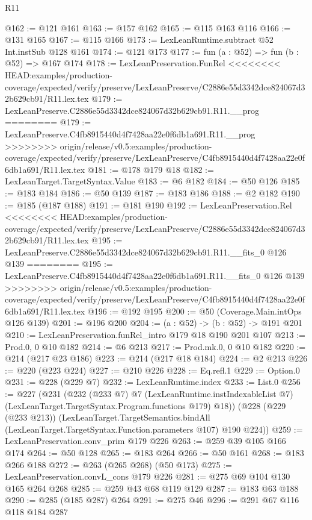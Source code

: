 \begin{lexlean}{R11}
\begin{coremodule}
{{{{{@162 := @121 @161
@163 := @157 @162
@165 := @115 @163 @116
@166 := @131 @165
@167 := @115 @166
@173 := LexLeanRuntime.subtract @52 Int.instSub @128 @161
@174 := @121 @173
@177 := fun (a : @52) => fun (b : @52) => @167 @174
@178 := LexLeanPreservation.FunRel
<<<<<<<< HEAD:examples/production-coverage/expected/verify/preserve/LexLeanPreserve/C2886e55d3342dce824067d32b629cb91/R11.lex.tex
@179 := LexLeanPreserve.C2886e55d3342dce824067d32b629cb91.R11.__prog
========
@179 := LexLeanPreserve.C4fb8915440d4f7428aa22e0f6db1a691.R11.__prog
>>>>>>>> origin/release/v0.5:examples/production-coverage/expected/verify/preserve/LexLeanPreserve/C4fb8915440d4f7428aa22e0f6db1a691/R11.lex.tex
@181 := @178 @179 @18
@182 := LexLeanTarget.TargetSyntax.Value
@183 := @6 @182
@184 := @50 @126
@185 := @183 @184
@186 := @50 @139
@187 := @183 @186
@188 := @2 @182
@190 := @185 (@187 @188)
@191 := @181 @190
@192 := LexLeanPreservation.Rel
<<<<<<<< HEAD:examples/production-coverage/expected/verify/preserve/LexLeanPreserve/C2886e55d3342dce824067d32b629cb91/R11.lex.tex
@195 := LexLeanPreserve.C2886e55d3342dce824067d32b629cb91.R11.__fits_0 @126 @139
========
@195 := LexLeanPreserve.C4fb8915440d4f7428aa22e0f6db1a691.R11.__fits_0 @126 @139
>>>>>>>> origin/release/v0.5:examples/production-coverage/expected/verify/preserve/LexLeanPreserve/C4fb8915440d4f7428aa22e0f6db1a691/R11.lex.tex
@196 := @192 @195
@200 := @50 (Coverage.Main.intOps @126 @139)
@201 := @196 @200
@204 := (a : @52) -> (b : @52) -> @191 @201
@210 := LexLeanPreservation.funRel_intro @179 @18 @190 @201 @107
@213 := Prod.{0, 0} @10 @182
@214 := @6 @213
@217 := Prod.mk.{0, 0} @10 @182
@220 := @214 (@217 @23 @186)
@223 := @214 (@217 @18 @184)
@224 := @2 @213
@226 := @220 (@223 @224)
@227 := @210 @226
@228 := Eq.refl.{1}
@229 := Option.{0}
@231 := @228 (@229 @7)
@232 := LexLeanRuntime.index
@233 := List.{0}
@256 := @227
    (@231
      (@232
        (@233 @7)
        @7
        (LexLeanRuntime.instIndexableList @7)
        (LexLeanTarget.TargetSyntax.Program.functions @179)
        @18))
    (@228
      (@229 (@233 @213))
      (LexLeanTarget.TargetSemantics.bindAll
        (LexLeanTarget.TargetSyntax.Function.parameters @107)
        @190
        @224))
@259 := LexLeanPreservation.conv_prim @179 @226
@263 := @259 @39 @105 @166 @174
@264 := @50 @128
@265 := @183 @264
@266 := @50 @161
@268 := @183 @266 @188
@272 := @263 (@265 @268) (@50 @173)
@275 := LexLeanPreservation.convL_cons @179 @226
@281 := @275 @69 @104 @130 @165 @264 @268
@285 := @259 @43 @68 @119 @129
@287 := @183 @63 @188
@290 := @285 (@185 @287) @264
@291 := @275 @46
@296 := @291 @67 @116 @118 @184 @287
}}}}}
\end{coremodule}
\end{lexlean}
